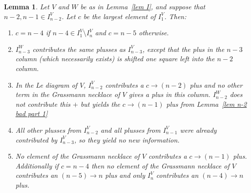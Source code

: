 \documentclass[11pt]{article}
\newtheorem{lem}[thm]{Lemma}
\theoremstyle{remark}
\theoremstyle{definition}
\begin{document}
  
  \begin{lem}\label{lem n-2 bad part 2}
    Let $V$ and $W$ be as in Lemma~\ref{lem I}, and suppose that $n-2,n-1 \in I_{n-2}^{V}$. Let $c$ be the largest element of $I_1^V$.  Then:
    \begin{enumerate}
  \item $c=n-4$ if $n-4\in I_1^V\setminus I_n^V$ and $c=n-5$ otherwise.
  \item $I_{n-3}^W$ contributes the same plusses as $I_{n-3}^V$, except that the plus in the $n-3$ column (which necessarily exists) is shifted one square left into the $n-2$ column.
  \item In the Le diagram of $V$, $I_{n-2}^{V}$ contributes a $c\rightarrow (n-2)$ plus and no other term in the Grassmann necklace of $V$ gives a plus in this column.  $I_{n-2}^W$ does not contribute this $+$ but yields the $c\rightarrow (n-1)$ plus from Lemma~\ref{lem n-2 bad part 1}
  \item All other plusses from $I_{n-2}^{V}$ and all plusses from $I_{n-1}^V$ were already contributed by $I_{n-3}^V$, so they yield no new information.
  \item No element of the Grassmann necklace of $V$ contributes a $c\rightarrow (n-1)$ plus.  Additionally if $c=n-4$ then no element of the Grassmann necklace of $V$ contributes an $(n-5)\rightarrow n$ plus and only $I_n^V$ contributes an $(n-4)\rightarrow n$ plus.
  \end{enumerate} 
\end{lem}
\end{document}
